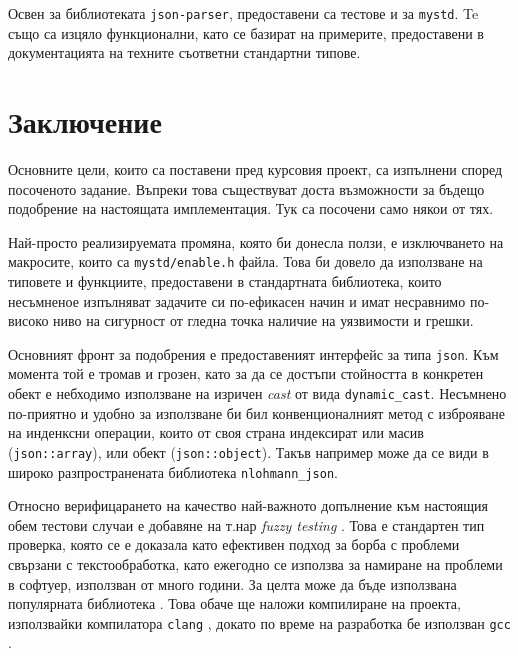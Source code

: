 \documentclass[10pt]{article}
\begin{document}
\par
Освен за библиотеката \verb|json-parser|, предоставени са тестове и за \verb|mystd|. Te също са изцяло функционални, като се базират на примерите, предоставени в документацията на техните съответни стандартни типове.

\section{Заключение}

\par
Основните цели, които са поставени пред курсовия проект, са изпълнени според посоченото задание. Въпреки това съществуват доста възможности за бъдещо подобрение на настоящата имплементация. Тук са посочени само някои от тях.

\par
Най-просто реализируемата промяна, която би донесла ползи, е изключването на макросите, които са \verb|mystd/enable.h| файла. Това би довело да използване на типовете и функциите, предоставени в стандартната библиотека, които несъмненое изпълняват задачите си по-ефикасен начин и имат несравнимо по-високо ниво на сигурност от гледна точка наличие на уязвимости и грешки.

\par
Основният фронт за подобрения е предоставеният интерфейс за типа \verb|json|. Към момента той е тромав и грозен, като за да се достъпи стойността в конкретен обект е небходимо използване на изричен \textit{cast} от вида \verb|dynamic_cast|. Несъмнено по-приятно и удобно за използване би бил конвенционалният метод с изброяване на инденксни операции, които от своя страна индексират или масив (\verb|json::array|), или обект (\verb|json::object|). Такъв например може да се види в широко разпространената библиотека \verb|nlohmann_json|. 

\par
Относно верифицарането на качество най-важното допълнение към настоящия обем тестови случаи е добавяне на т.нар \textit{fuzzy testing} \autocite{fuzzytesting}. Това е стандартен тип проверка, която се е доказала като ефективен подход за борба с проблеми свързани с текстообработка, като ежегодно се използва за намиране на проблеми в софтуер, използван от много години. За целта може да бъде използвана популярната библиотека \autocite{libFuzzer}. Това обаче
ще наложи компилиране на проекта, използвайки компилатора \verb|clang| \autocite{llvm}, докато по време на разработка бе използван \verb|gcc| \autocite{gcc}.

\printbibliography
\end{document}
